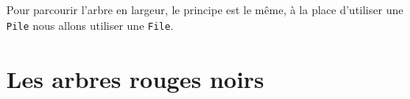 Pour parcourir l'arbre en largeur, le principe est le même, à la place d'utiliser une \texttt{Pile} nous allons utiliser une \texttt{File}.


\section{Les arbres rouges noirs}

